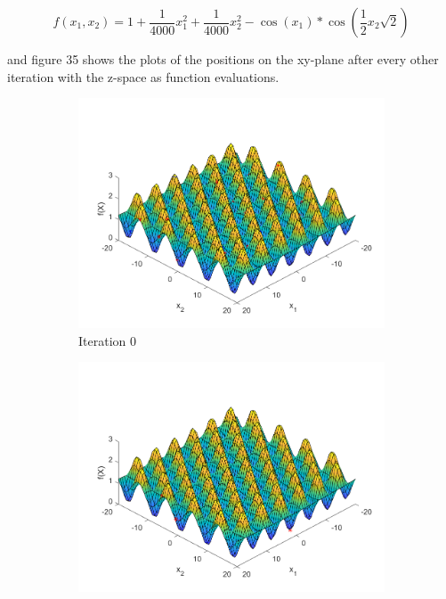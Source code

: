 $$
  f(x_1, x_2) = 1 + \frac{1}{4000}x_1^2 + \frac{1}{4000}x_2^2 - \cos(x_1) * \cos(\frac{1}{2}x_2\sqrt{2})
$$

and figure 35 shows the plots of the positions on the xy-plane after every other iteration with the z-space as function evaluations.

\begin{figure}
  \centering
 \begin{subfigure}[b]{0.4\textwidth}
   \includegraphics[width=\textwidth]{img/smpl/grwnk2d/loa-iter-0}
   \caption{Iteration 0}
   \label{fig:s7-iter-0}
 \end{subfigure}
 \begin{subfigure}[b]{0.4\textwidth}
   \includegraphics[width=\textwidth]{img/smpl/grwnk2d/loa-iter-7}

\end{subfigure}
\end{figure}
